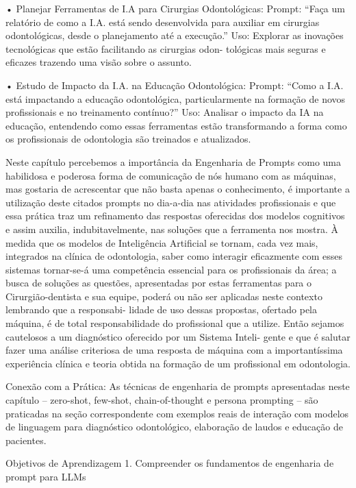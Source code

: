     • Planejar Ferramentas de I.A para Cirurgias Odontológicas:
      Prompt: “Faça um relatório de como a I.A. está sendo desenvolvida para auxiliar
      em cirurgias odontológicas, desde o planejamento até a execução.”
      Uso: Explorar as inovações tecnológicas que estão facilitando as cirurgias odon-
      tológicas mais seguras e eficazes trazendo uma visão sobre o assunto.

    • Estudo de Impacto da I.A. na Educação Odontológica:
      Prompt: “Como a I.A. está impactando a educação odontológica, particularmente
      na formação de novos profissionais e no treinamento contínuo?”
      Uso: Analisar o impacto da IA na educação, entendendo como essas ferramentas
      estão transformando a forma como os profissionais de odontologia são treinados
      e atualizados.

          Neste capítulo percebemos a importância da Engenharia de Prompts como
uma habilidosa e poderosa forma de comunicação de nós humano com as máquinas,
mas gostaria de acrescentar que não basta apenas o conhecimento, é importante a
utilização deste citados prompts no dia-a-dia nas atividades profissionais e que essa
prática traz um refinamento das respostas oferecidas dos modelos cognitivos e assim
auxilia, indubitavelmente, nas soluções que a ferramenta nos mostra.
         À medida que os modelos de Inteligência Artificial se tornam, cada vez mais,
integrados na clínica de odontologia, saber como interagir eficazmente com esses
sistemas tornar-se-á uma competência essencial para os profissionais da área; a busca
de soluções as questões, apresentadas por estas ferramentas para o Cirurgião-dentista
e sua equipe, poderá ou não ser aplicadas neste contexto lembrando que a responsabi-
lidade de uso dessas propostas, ofertado pela máquina, é de total responsabilidade do
profissional que a utilize.
        Então sejamos cautelosos a um diagnóstico oferecido por um Sistema Inteli-
gente e que é salutar fazer uma análise criteriosa de uma resposta de máquina com a
importantíssima experiência clínica e teoria obtida na formação de um profissional em
odontologia.

Conexão com a Prática: As técnicas de engenharia de prompts apresentadas neste
capítulo – zero-shot, few-shot, chain-of-thought e persona prompting – são praticadas
na seção correspondente com exemplos reais de interação com modelos de linguagem
para diagnóstico odontológico, elaboração de laudos e educação de pacientes.


Objetivos de Aprendizagem
  1. Compreender os fundamentos de engenharia de prompt para LLMs

